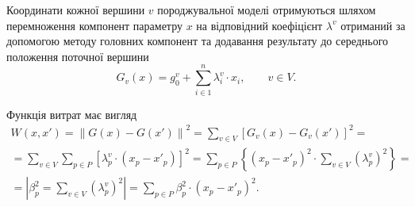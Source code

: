 Координати кожної вершини $v$ породжувальної моделі отримуються шляхом
перемноження компонент параметру $x$ на відповідний коефіцієнт $\lambda^v$
отриманий за допомогою методу головних компонент
та додавання результату до середнього положення поточної вершини
\begin{equation*}
  G_v\left( x \right) = g_0^v + \sum_{i \in 1}^n \lambda_i^v \cdot x_i,
  \qquad v \in V.
\end{equation*}

Функція витрат має вигляд
\begin{equation*}
  \begin{split}
    W \left( x, x' \right)
    = \left\| G\left( x \right) - G\left( x' \right) \right\|^2
    = \sum_{v \in V} \left[
        G_v\left( x \right) - G_v\left( x' \right)
      \right]^2 = \\
    = \sum_{v \in V} \sum_{p \in P} \left[
        \lambda_p^v \cdot \left( x_p - x'_p \right)
      \right]^2
    = \sum_{p \in P} \left\{ \left( x_p - x'_p \right)^2
      \cdot \sum_{v \in V} \left( \lambda_p^v \right)^2 \right\} = \\
    = \left| \beta_p^2 = \sum_{v \in V} \left( \lambda_p^v \right)^2 \right|
    = \sum_{p \in P} \beta_p^2 \cdot \left( x_p - x'_p \right)^2.
  \end{split}
\end{equation*}

